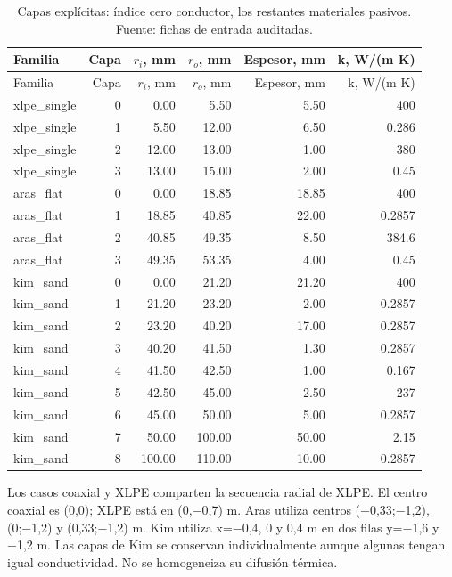 \begingroup\footnotesize\setlength{\tabcolsep}{3pt}
\begin{longtable}{L{4.2cm}rrrrr}
\caption{Capas explícitas: índice cero conductor, los restantes materiales pasivos. Fuente: fichas de entrada auditadas.}\label{tab:explicit-layers}\\
\toprule
Familia & Capa & $r_i$, mm & $r_o$, mm & Espesor, mm & k, W/(m K)\\
\midrule\endfirsthead
\toprule
Familia & Capa & $r_i$, mm & $r_o$, mm & Espesor, mm & k, W/(m K)\\
\midrule\endhead
xlpe\_single & 0 & 0.00 & 5.50 & 5.50 & 400\\
xlpe\_single & 1 & 5.50 & 12.00 & 6.50 & 0.286\\
xlpe\_single & 2 & 12.00 & 13.00 & 1.00 & 380\\
xlpe\_single & 3 & 13.00 & 15.00 & 2.00 & 0.45\\
aras\_flat & 0 & 0.00 & 18.85 & 18.85 & 400\\
aras\_flat & 1 & 18.85 & 40.85 & 22.00 & 0.2857\\
aras\_flat & 2 & 40.85 & 49.35 & 8.50 & 384.6\\
aras\_flat & 3 & 49.35 & 53.35 & 4.00 & 0.45\\
kim\_sand & 0 & 0.00 & 21.20 & 21.20 & 400\\
kim\_sand & 1 & 21.20 & 23.20 & 2.00 & 0.2857\\
kim\_sand & 2 & 23.20 & 40.20 & 17.00 & 0.2857\\
kim\_sand & 3 & 40.20 & 41.50 & 1.30 & 0.2857\\
kim\_sand & 4 & 41.50 & 42.50 & 1.00 & 0.167\\
kim\_sand & 5 & 42.50 & 45.00 & 2.50 & 237\\
kim\_sand & 6 & 45.00 & 50.00 & 5.00 & 0.2857\\
kim\_sand & 7 & 50.00 & 100.00 & 50.00 & 2.15\\
kim\_sand & 8 & 100.00 & 110.00 & 10.00 & 0.2857\\
\bottomrule\end{longtable}\endgroup

Los casos coaxial y XLPE comparten la secuencia radial de XLPE. El centro coaxial es (0,0); XLPE está en (0,−0,7) m. Aras utiliza centros (−0,33;−1,2), (0;−1,2) y (0,33;−1,2) m. Kim utiliza x=−0,4, 0 y 0,4 m en dos filas y=−1,6 y −1,2 m. Las capas de Kim se conservan individualmente aunque algunas tengan igual conductividad. No se homogeneiza su difusión térmica.

